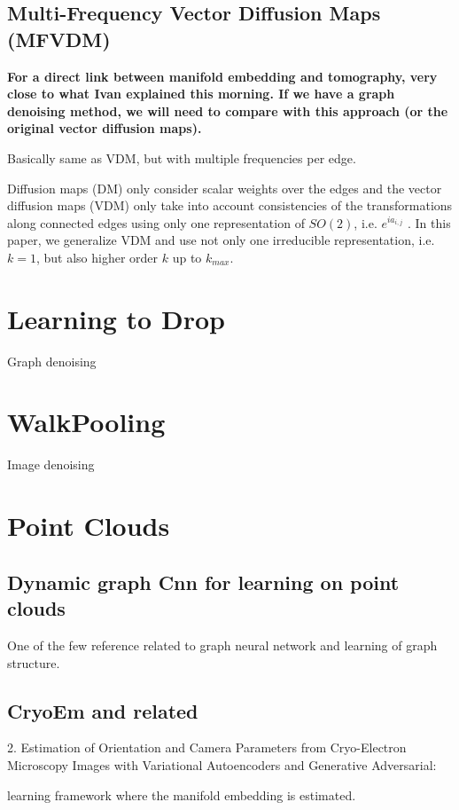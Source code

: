 \subsection{Multi-Frequency Vector Diffusion Maps (MFVDM)}
\cite{multiDiffusionMaps}
\textbf{For a direct link between manifold embedding and tomography, very close to what Ivan explained this morning.
If we have a graph denoising method, we will need to compare with this approach 
(or the original vector diffusion maps).}

Basically same as VDM, but with multiple frequencies per edge.

Diffusion maps (DM) only consider scalar weights over the edges and the vector
diffusion maps (VDM) only take into account consistencies
of the transformations along connected edges using only one
representation of $SO(2)$, i.e. $e^{ia_{i,j}}$ . In this paper, we generalize
VDM and use not only one irreducible representation,
i.e. $k = 1$, but also higher order $k$ up to $k_{max}$.





\section{Learning to Drop}
Graph denoising


\section{WalkPooling}
Image denoising

\section{Point Clouds}
\subsection{Dynamic graph Cnn for learning on point clouds}
One of the few reference related to graph neural network and learning of graph structure. 


\subsection{CryoEm and related}
2. Estimation of Orientation and Camera Parameters from Cryo-Electron Microscopy Images with Variational Autoencoders and Generative Adversarial: 

learning framework where the manifold embedding is estimated.

